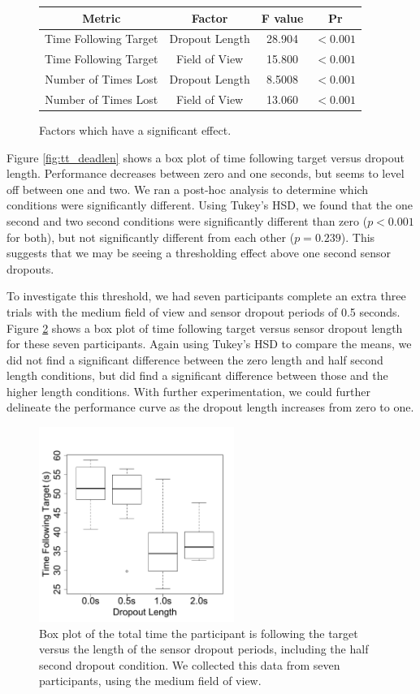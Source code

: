 \documentclass{acmsiggraph}                     %
\begin{document}
\begin{figure}[h]
\centering
\begin{tabular}{|c|c|c|c|}
\hline
Metric & Factor & F value & Pr \\
\hline
Time Following Target & Dropout Length & 28.904 & $<0.001$\\
Time Following Target & Field of View & 15.800 & $<0.001$\\
Number of Times Lost & Dropout Length & 8.5008 & $<0.001$\\
Number of Times Lost & Field of View & 13.060 & $<0.001$\\
\hline
\end{tabular}
 \caption{\label{fig:anova}Factors which have a significant effect.}
\end{figure}

Figure \ref{fig:tt_deadlen} shows a box plot of time following target versus dropout length.  Performance decreases between zero and one seconds, but seems to level off between one and two.  We ran a post-hoc analysis to determine which conditions were significantly different.  Using Tukey's HSD, we found that the one second and two second conditions were significantly different than zero ($p<0.001$ for both), but not significantly different from each other ($p=0.239$).  This suggests that we may be seeing a thresholding effect above one second sensor dropouts.

To investigate this threshold, we had seven participants complete an extra three trials with the medium field of view and sensor dropout periods of 0.5 seconds.  Figure \ref{fig:extra} shows a box plot of time following target versus sensor dropout length for these seven participants.  Again using Tukey's HSD to compare the means, we did not find a significant difference between the zero length and half second length conditions, but did find a significant difference between those and the higher length conditions.
With further experimentation, we could further delineate the performance curve as the dropout length increases from zero to one.

\begin{figure}[htb]
	\centering
	\includegraphics[width=2.5in]{figures/extra.pdf}
	\caption{\label{fig:extra}Box plot of the total time the participant is following the target versus the length of the sensor dropout periods, including the half second dropout condition.  We collected this data from seven participants, using the medium field of view.}
\end{figure}
\end{document}
